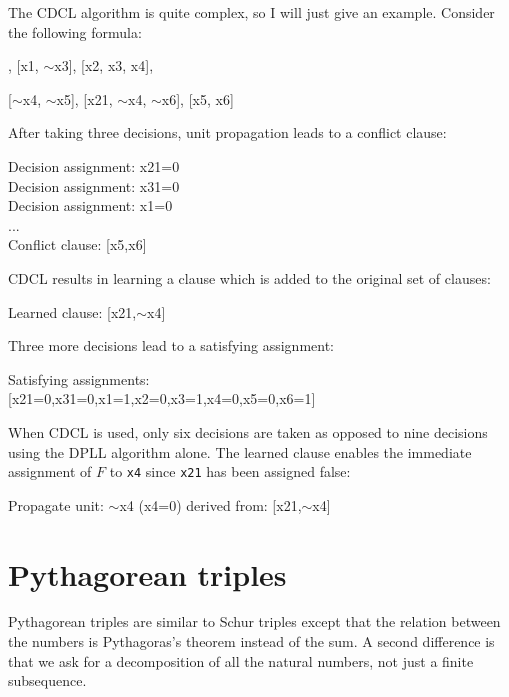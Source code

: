\documentclass[11pt,a4paper]{article}
\begin{document}
The CDCL algorithm is quite complex, so I will just give an example. Consider the following formula:

\begin{ttfamily}
[x1, x31, $\sim$x2], [x1, $\sim$x3], [x2, x3, x4],

[$\sim$x4, $\sim$x5], [x21, $\sim$x4, $\sim$x6], [x5, x6]
\end{ttfamily}

After taking three decisions, unit propagation leads to a conflict clause:

\begin{ttfamily}
Decision assignment: x21=0\\
Decision assignment: x31=0\\
Decision assignment: x1=0\\
  ...\\
Conflict clause: [x5,x6]
\end{ttfamily}

CDCL results in learning a clause which is added to the original set of clauses:

\begin{ttfamily}
Learned clause: [x21,$\sim$x4]
\end{ttfamily}

Three more decisions lead to a satisfying assignment:

\begin{ttfamily}
Satisfying assignments:\\
{[}x21=0,x31=0,x1=1,x2=0,x3=1,x4=0,x5=0,x6=1]
\end{ttfamily}

When CDCL is used, only six decisions are taken as opposed to nine decisions using the DPLL algorithm alone. The learned clause enables the immediate assignment of $F$ to \texttt{x4} since \texttt{x21} has been assigned false:

\begin{ttfamily}
Propagate unit: $\sim$x4 (x4=0) derived from: [x21,$\sim$x4]
\end{ttfamily}

\section{Pythagorean triples}

Pythagorean triples are similar to Schur triples except that the relation between the numbers is Pythagoras's theorem instead of the sum. A second difference is that we ask for a decomposition of all the natural numbers, not just a finite subsequence.
\end{document}
